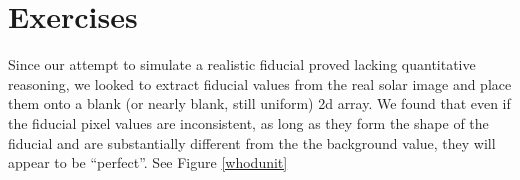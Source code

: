 \documentclass[10pt]{scrartcl}
\begin{document}
\newpage

\section{Exercises}
    Since our attempt to simulate a realistic fiducial proved lacking quantitative reasoning, we looked to extract fiducial values from the real solar image and place them onto a blank (or nearly blank, still uniform) 2d array. We found that even if the fiducial pixel values are inconsistent, as long as they form the shape of the fiducial and are substantially different from the the background value, they will appear to be ``perfect''. See Figure \ref{whodunit}

\begin{figure}[!ht]
\end{figure}
\end{document}
